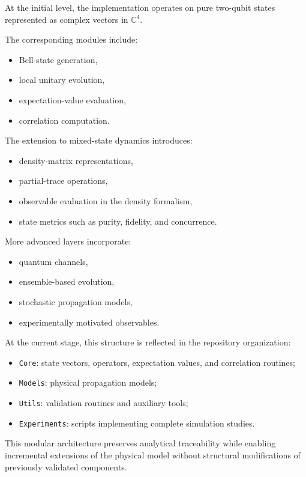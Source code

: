 \medskip

At the initial level, the implementation operates on pure two-qubit states represented as complex vectors in \( \mathbb{C}^4 \).

The corresponding modules include:
\begin{itemize}
\item Bell-state generation,
\item local unitary evolution,
\item expectation-value evaluation,
\item correlation computation.
\end{itemize}

\medskip

The extension to mixed-state dynamics introduces:
\begin{itemize}
\item density-matrix representations,
\item partial-trace operations,
\item observable evaluation in the density formalism,
\item state metrics such as purity, fidelity, and concurrence.
\end{itemize}

\medskip

More advanced layers incorporate:
\begin{itemize}
\item quantum channels,
\item ensemble-based evolution,
\item stochastic propagation models,
\item experimentally motivated observables.
\end{itemize}

\medskip

At the current stage, this structure is reflected in the repository organization:
\begin{itemize}
\item \texttt{Core}: state vectors, operators, expectation values, and correlation routines;
\item \texttt{Models}: physical propagation models;
\item \texttt{Utils}: validation routines and auxiliary tools;
\item \texttt{Experiments}: scripts implementing complete simulation studies.
\end{itemize}

\medskip

This modular architecture preserves analytical traceability while enabling incremental extensions of the physical model without structural modifications of previously validated components.